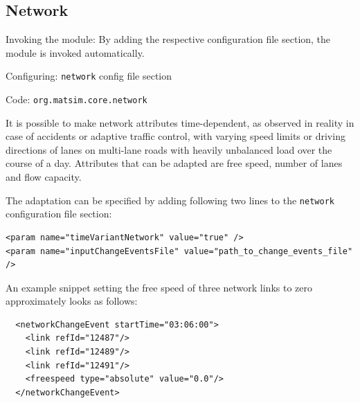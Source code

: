 \subsection{Network}
\label{sec:network}
\begin{compactitem}
\item Invoking the module: By adding the respective configuration file section, the module is invoked automatically.
\item Configuring: \lstinline|network| config file section
\item Code: \lstinline|org.matsim.core.network|
\end{compactitem}

It is possible to make network attributes time-dependent, as observed in reality in case of accidents or adaptive traffic control, with varying speed limits or driving directions of lanes on multi-lane roads with heavily unbalanced load over the course of a day. Attributes that can be adapted are free speed, number of lanes and flow capacity.

The adaptation can be specified by adding following two lines to the \lstinline|network| configuration file section:
\begin{lstlisting}
<param name="timeVariantNetwork" value="true" />
<param name="inputChangeEventsFile" value="path_to_change_events_file" />
\end{lstlisting}
%
An example snippet setting the free speed of three network links to zero approximately looks as follows:
%
\begin{lstlisting}
  <networkChangeEvent startTime="03:06:00">
    <link refId="12487"/>
    <link refId="12489"/>
    <link refId="12491"/>
    <freespeed type="absolute" value="0.0"/>
  </networkChangeEvent>

\end{lstlisting}
%

